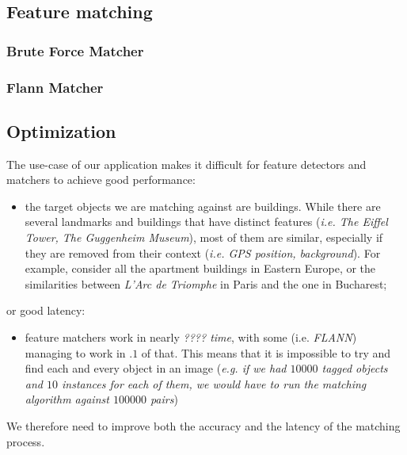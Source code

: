 \documentclass[a4paper,onecolumn,oneside,titlepage,12pt]{report}
\begin{document}
\subsection{Feature matching}

\subsubsection{Brute Force Matcher}
\subsubsection{Flann Matcher}

\subsection{Optimization}
The use-case of our application makes it difficult for feature detectors and matchers to achieve good performance:
\begin{itemize}
	\item the target objects we are matching against are buildings. While there are several landmarks and buildings that have distinct features (\emph{i.e. The Eiffel Tower, The Guggenheim Museum}), most of them are similar, especially if they are removed from their context (\emph{i.e. GPS position, background}). For example, consider all the apartment buildings in Eastern Europe, or the similarities between \emph{L'Arc de Triomphe} in Paris and the one in Bucharest;
\end{itemize}
or good latency:
\begin{itemize}
	\item feature matchers work in nearly \emph{???? time}, with some (i.e. \emph{FLANN}) managing to work in $.1$ of that. This means that it is impossible to try and find each and every object in an image (\emph{e.g. if we had $10000$ tagged objects and $10$ instances for each of them, we would have to run the matching algorithm against $100000$ pairs})
\end{itemize}
We therefore need to improve both the accuracy and the latency of the matching process.
\end{document}

